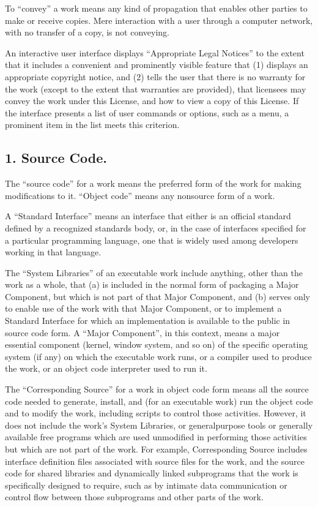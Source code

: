 \documentclass[letterpaper,10pt,english]{sphinxmanual}
\begin{document}
\sphinxAtStartPar
To “convey” a work means any kind of propagation that enables other
parties to make or receive copies.  Mere interaction with a user through
a computer network, with no transfer of a copy, is not conveying.

\sphinxAtStartPar
An interactive user interface displays “Appropriate Legal Notices”
to the extent that it includes a convenient and prominently visible
feature that (1) displays an appropriate copyright notice, and (2)
tells the user that there is no warranty for the work (except to the
extent that warranties are provided), that licensees may convey the
work under this License, and how to view a copy of this License.  If
the interface presents a list of user commands or options, such as a
menu, a prominent item in the list meets this criterion.


\subsection{1. Source Code.}
\label{\detokenize{license:source-code}}
\sphinxAtStartPar
The “source code” for a work means the preferred form of the work
for making modifications to it.  “Object code” means any non\sphinxhyphen{}source
form of a work.

\sphinxAtStartPar
A “Standard Interface” means an interface that either is an official
standard defined by a recognized standards body, or, in the case of
interfaces specified for a particular programming language, one that
is widely used among developers working in that language.

\sphinxAtStartPar
The “System Libraries” of an executable work include anything, other
than the work as a whole, that (a) is included in the normal form of
packaging a Major Component, but which is not part of that Major
Component, and (b) serves only to enable use of the work with that
Major Component, or to implement a Standard Interface for which an
implementation is available to the public in source code form.  A
“Major Component”, in this context, means a major essential component
(kernel, window system, and so on) of the specific operating system
(if any) on which the executable work runs, or a compiler used to
produce the work, or an object code interpreter used to run it.

\sphinxAtStartPar
The “Corresponding Source” for a work in object code form means all
the source code needed to generate, install, and (for an executable
work) run the object code and to modify the work, including scripts to
control those activities.  However, it does not include the work’s
System Libraries, or general\sphinxhyphen{}purpose tools or generally available free
programs which are used unmodified in performing those activities but
which are not part of the work.  For example, Corresponding Source
includes interface definition files associated with source files for
the work, and the source code for shared libraries and dynamically
linked subprograms that the work is specifically designed to require,
such as by intimate data communication or control flow between those
subprograms and other parts of the work.
\end{document}
